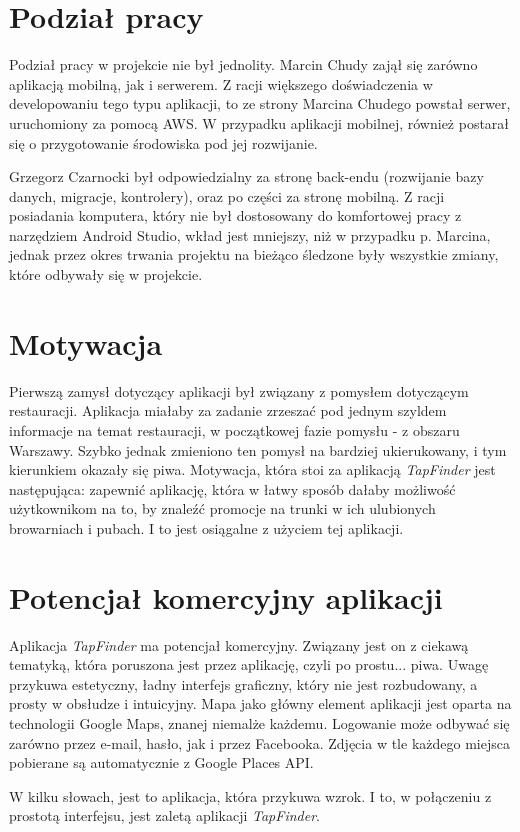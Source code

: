 \documentclass[a4paper]{article}
\begin{document}
\section{Podział pracy}

Podział pracy w projekcie nie był jednolity. Marcin Chudy zajął się zarówno aplikacją mobilną, jak i serwerem. Z racji większego doświadczenia w developowaniu tego typu aplikacji, to ze strony Marcina Chudego powstał serwer, uruchomiony za pomocą AWS. W przypadku aplikacji mobilnej, również postarał się o przygotowanie środowiska pod jej rozwijanie.

Grzegorz Czarnocki był odpowiedzialny za stronę back-endu (rozwijanie bazy danych, migracje, kontrolery), oraz po części za stronę mobilną. Z racji posiadania komputera, który nie był dostosowany do komfortowej pracy z narzędziem Android Studio, wkład jest mniejszy, niż w przypadku p. Marcina, jednak przez okres trwania projektu na bieżąco śledzone były wszystkie zmiany, które odbywały się w projekcie.

\section{Motywacja}

Pierwszą zamysł dotyczący aplikacji był związany z pomysłem dotyczącym restauracji. Aplikacja miałaby za zadanie zrzeszać pod jednym szyldem informacje na temat restauracji, w początkowej fazie pomysłu - z obszaru Warszawy. Szybko jednak zmieniono ten pomysł na bardziej ukierukowany, i tym kierunkiem okazały się piwa. Motywacja, która stoi za aplikacją \textit{TapFinder} jest następująca: zapewnić aplikację, która w łatwy sposób dałaby możliwość użytkownikom na to, by znaleźć promocje na trunki w ich ulubionych browarniach i pubach. I to jest osiągalne z użyciem tej aplikacji.

\section{Potencjał komercyjny aplikacji}

Aplikacja \textit{TapFinder} ma potencjał komercyjny. Związany jest on z ciekawą tematyką, która poruszona jest przez aplikację, czyli po prostu... piwa. Uwagę przykuwa estetyczny, ładny interfejs graficzny, który nie jest rozbudowany, a prosty w obsłudze i intuicyjny. Mapa jako główny element aplikacji jest oparta na technologii Google Maps, znanej niemalże każdemu. Logowanie może odbywać się zarówno przez e-mail, hasło, jak i przez Facebooka. Zdjęcia w tle każdego miejsca pobierane są automatycznie z Google Places API.

W kilku słowach, jest to aplikacja, która przykuwa wzrok. I to, w połączeniu z prostotą interfejsu, jest zaletą aplikacji \textit{TapFinder}.
\end{document}
